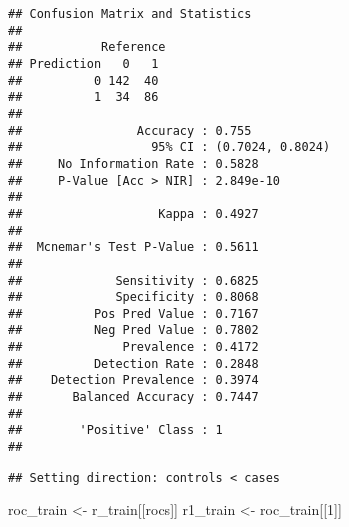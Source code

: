 \documentclass[
]{article}
\newenvironment{Shaded}{\begin{snugshade}}{\end{snugshade}}
\newcommand{\AttributeTok}[1]{\textcolor[rgb]{0.77,0.63,0.00}{#1}}
\newcommand{\CommentTok}[1]{\textcolor[rgb]{0.56,0.35,0.01}{\textit{#1}}}
\newcommand{\ConstantTok}[1]{\textcolor[rgb]{0.00,0.00,0.00}{#1}}
\newcommand{\DecValTok}[1]{\textcolor[rgb]{0.00,0.00,0.81}{#1}}
\newcommand{\FunctionTok}[1]{\textcolor[rgb]{0.00,0.00,0.00}{#1}}
\newcommand{\NormalTok}[1]{#1}
\newcommand{\OtherTok}[1]{\textcolor[rgb]{0.56,0.35,0.01}{#1}}
\newcommand{\SpecialCharTok}[1]{\textcolor[rgb]{0.00,0.00,0.00}{#1}}
\newcommand{\StringTok}[1]{\textcolor[rgb]{0.31,0.60,0.02}{#1}}
\begin{document}
\begin{verbatim}
## Confusion Matrix and Statistics
## 
##           Reference
## Prediction   0   1
##          0 142  40
##          1  34  86
##                                           
##                Accuracy : 0.755           
##                  95% CI : (0.7024, 0.8024)
##     No Information Rate : 0.5828          
##     P-Value [Acc > NIR] : 2.849e-10       
##                                           
##                   Kappa : 0.4927          
##                                           
##  Mcnemar's Test P-Value : 0.5611          
##                                           
##             Sensitivity : 0.6825          
##             Specificity : 0.8068          
##          Pos Pred Value : 0.7167          
##          Neg Pred Value : 0.7802          
##              Prevalence : 0.4172          
##          Detection Rate : 0.2848          
##    Detection Prevalence : 0.3974          
##       Balanced Accuracy : 0.7447          
##                                           
##        'Positive' Class : 1               
## 
\end{verbatim}

\begin{Shaded}
\end{Shaded}

\begin{verbatim}
## Setting direction: controls < cases
\end{verbatim}

\begin{Shaded}
\begin{Highlighting}[]
\NormalTok{roc\_train }\OtherTok{\textless{}{-}}\NormalTok{ r\_train[[}\StringTok{\textquotesingle{}rocs\textquotesingle{}}\NormalTok{]]}
\NormalTok{r1\_train }\OtherTok{\textless{}{-}}\NormalTok{ roc\_train[[}\DecValTok{1}\NormalTok{]]}
\end{Highlighting}
\end{Shaded}
\end{document}
